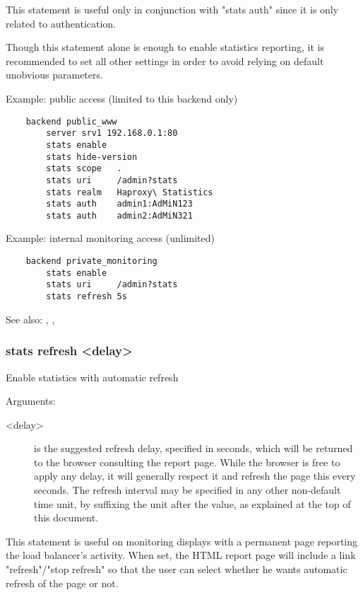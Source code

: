   This statement is useful only in conjunction with "stats auth" since it is
  only related to authentication.

  Though this statement alone is enough to enable statistics reporting, it is
  recommended to set all other settings in order to avoid relying on default
  unobvious parameters.

  Example: public access (limited to this backend only)
  \begin{verbatim}
    backend public_www
        server srv1 192.168.0.1:80
        stats enable
        stats hide-version
        stats scope   .
        stats uri     /admin?stats
        stats realm   Haproxy\ Statistics
        stats auth    admin1:AdMiN123
        stats auth    admin2:AdMiN321
   \end{verbatim}

   Example: internal monitoring access (unlimited)
   \begin{verbatim}
    backend private_monitoring
        stats enable
        stats uri     /admin?stats
        stats refresh 5s
   \end{verbatim}

  See also: , , 

\subsubsection[stats refresh]{stats refresh <delay>}


  Enable statistics with automatic refresh


  Arguments:
  \begin{description}
  \item[<delay>] is the suggested refresh delay, specified in seconds, which will
              be returned to the browser consulting the report page. While the
              browser is free to apply any delay, it will generally respect it
              and refresh the page this every seconds. The refresh interval may
              be specified in any other non-default time unit, by suffixing the
              unit after the value, as explained at the top of this document.
  \end{description}

  This statement is useful on monitoring displays with a permanent page
  reporting the load balancer's activity. When set, the HTML report page will
  include a link "refresh"/"stop refresh" so that the user can select whether
  he wants automatic refresh of the page or not.

